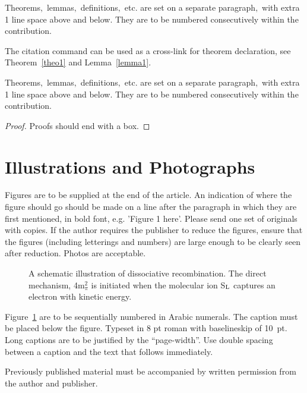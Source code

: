 \documentclass{ws-ijicc}
\begin{document}
\begin{theorem}
\label{theo1}
Theorems$,$ lemmas$,$ definitions$,$ etc. are set on a separate
paragraph$,$ with extra 1 line space above and below. They are to be
numbered consecutively within the contribution.
\end{theorem}

The citation command can be used as a cross-link for theorem
declaration, see Theorem~\ref{theo1} and Lemma~\ref{lemma1}.

\begin{lemma}
\label{lemma1}
Theorems$,$ lemmas$,$ definitions$,$ etc. are set on a separate
paragraph$,$ with extra 1 line space above and below. They are to be
numbered consecutively within the contribution.
\end{lemma}

\begin{proof}
Proofs should end with a box.
\end{proof}

\section{Illustrations and Photographs}
Figures are to be supplied at the end of the article. An indication
of where the figure should go should be made on a line after the
paragraph in which they are first mentioned, in bold font, e.g.
'Figure 1 here'.  Please send one set of originals with copies. If
the author requires the publisher to reduce the figures, ensure that
the figures (including letterings and numbers) are large enough to
be clearly seen after reduction. Photos are acceptable.

\begin{figure}[th]
\centerline{}
\vspace*{8pt}
\caption{A schematic illustration of dissociative recombination. The
direct mechanism, 4m$^2_\pi$ is initiated when the molecular ion
S$_{\rm L}$ captures an electron with kinetic energy.\label{one}}
\end{figure}

Figure~\ref{one} are to be sequentially numbered in Arabic
numerals. The caption must be placed below the figure. Typeset in 8 pt
roman with baselineskip of 10~pt. Long captions are to be justified by
the ``page-width''.  Use double spacing between a caption and the text
that follows immediately.

Previously published material must be accompanied by written
permission from the author and publisher.
\end{document}
